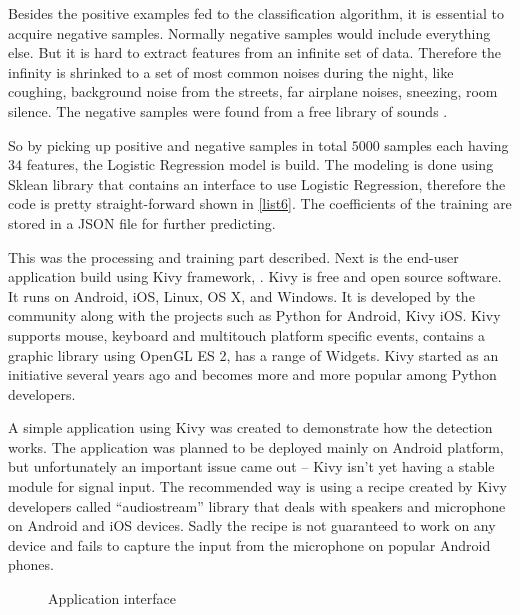 Besides the positive examples fed to the classification algorithm, it is essential to acquire negative samples. Normally negative samples would include everything else. But it is hard to extract features from an infinite set of data. Therefore the infinity is shrinked to a set of most common noises during the night, like coughing, background noise from the streets, far airplane noises, sneezing, room silence. The negative samples were found from a free library of sounds \cite{freesounds}.

So by picking up positive and negative samples in total $5000$ samples each having $34$ features, the Logistic Regression model is build. The modeling is done using Sklean library that contains an interface to use Logistic Regression, therefore the code is pretty straight-forward shown in \ref{list6}. The coefficients of the training are stored in a JSON file for further predicting.



This was the processing and training part described. Next is the end-user application build using Kivy framework, \cite{kivy}. Kivy is free and open source software. It runs on Android, iOS, Linux, OS X, and Windows. It is developed by the community along with the projects such as Python for Android, Kivy iOS. Kivy supports mouse, keyboard and multitouch platform specific events, contains a graphic library using OpenGL ES 2, has a range of Widgets. Kivy started as an initiative several years ago and becomes more and more popular among Python developers.

A simple application using Kivy was created to demonstrate how the detection works. The application was planned to be deployed mainly on Android platform, but unfortunately an important issue came out -- Kivy isn't yet having a stable module for signal input. The recommended way is using a recipe created by Kivy developers called ``audiostream'' library that deals with speakers and microphone on Android and iOS devices. Sadly the recipe is not guaranteed to work on any device and fails to capture the input from the microphone on popular Android phones.

\begin{figure}[!ht]
  \centering
  \vspace{0.08cm}
  \caption{Application interface}
  \label{fig:screens}
\end{figure}


